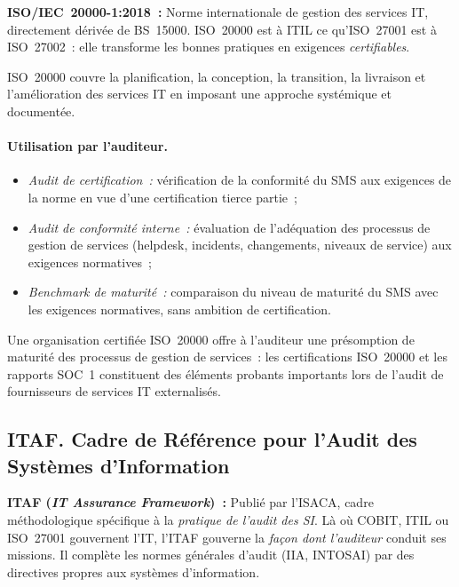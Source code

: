 \begin{boxdef}
\textbf{ISO/IEC~20000-1:2018~:} Norme internationale de gestion des services IT, directement
dérivée de BS~15000. ISO~20000 est à ITIL ce qu'ISO~27001 est à ISO~27002~: elle transforme les
bonnes pratiques en exigences \emph{certifiables}.
\end{boxdef}

ISO~20000 couvre la planification, la conception, la transition, la livraison et l'amélioration
des services IT en imposant une approche systémique et documentée.

\paragraph{Utilisation par l'auditeur.}
\begin{itemize}
    \item \emph{Audit de certification~:} vérification de la conformité du SMS aux exigences de
        la norme en vue d'une certification tierce partie~;
    \item \emph{Audit de conformité interne~:} évaluation de l'adéquation des processus de
        gestion de services (helpdesk, incidents, changements, niveaux de service) aux exigences
        normatives~;
    \item \emph{Benchmark de maturité~:} comparaison du niveau de maturité du SMS avec les
        exigences normatives, sans ambition de certification.
\end{itemize}

Une organisation certifiée ISO~20000 offre à l'auditeur une présomption de maturité des
processus de gestion de services~: les certifications ISO~20000 et les rapports SOC~1
constituent des éléments probants importants lors de l'audit de fournisseurs de services IT
externalisés.

\subsection{ITAF. Cadre de Référence pour l'Audit des Systèmes d'Information}
\label{subsec:itaf}

\begin{boxdef}
\textbf{ITAF (\emph{IT Assurance Framework})~:} Publié par l'ISACA, cadre méthodologique
spécifique à la \emph{pratique de l'audit des SI}. Là où COBIT, ITIL ou ISO~27001 gouvernent
l'IT, l'ITAF gouverne la \emph{façon dont l'auditeur} conduit ses missions. Il complète les
normes générales d'audit (IIA, INTOSAI) par des directives propres aux systèmes d'information.
\end{boxdef}

